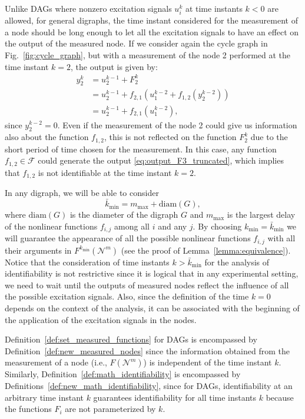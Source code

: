 \documentclass[letterpaper,10pt,journal]{IEEEtran}
\newcommand{\F}{\mathcal{F}}
\newcommand{\NN}{\mathcal{N}}
\begin{document}
Unlike DAGs where nonzero excitation signals $u_i^k$ at time instants $k<0$ are allowed, for general digraphs, the time instant considered for the measurement of a node should be long enough to let all the excitation signals to have an effect on the output of the measured node. If we consider again the cycle graph in Fig.~\ref{fig:cycle_graph}, but with a measurement of the node 2 performed at the time instant $k=2$, the output is given by:
\begin{align}
    y_2^k&=u_2^{k-1}+F_2^k\nonumber\\
    &=u_2^{k-1}+f_{2,1}(u_1^{k-2}+f_{1,2}(y_2^{k-2}))\nonumber\\
    &=u_2^{k-1}+f_{2,1}(u_1^{k-2}),\label{eq:output_F3_truncated}
\end{align}
since $y_2^{k-2}=0$. Even if the measurement of the node 2 could give us information also about the function $f_{1,2}$, this is not reflected on the function $F_2^k$ due to the short period of time chosen for the measurement. In this case, any function $f_{1,2}\in \F$ could generate the output \eqref{eq:output_F3_truncated}, which implies that $f_{1,2}$ is not identifiable at the time instant $k=2$. 


In any digraph, we will be able to consider
\begin{equation}\label{eq:k_min}
\bar k_{\min}=m_{\max}+\text{diam}(G),    
\end{equation}
where $\text{diam}(G)$ is the diameter of the digraph $G$ and $m_{\max}$ is the largest delay of the nonlinear functions $f_{i,j}$ among all $i$ and any $j$. By choosing $k_{\min}=\bar k_{\min}$ we will guarantee the appearance of all the possible nonlinear functions $f_{i,j}$ with all their arguments in $F^{k_{\min}}(\NN^m)$ (see the proof of Lemma~\ref{lemma:equivalence}). 
Notice that the consideration of time instants $k> \bar k_{\min}$ for the analysis of identifiability is not restrictive since it is logical that in any experimental setting, we need to wait until the outputs of measured nodes reflect the influence of all the possible excitation signals. Also, since the definition of the time $k=0$ depends on the context of the analysis, it can be associated with the beginning of the application of the excitation signals in the nodes.

 Definition~\ref{def:set_measured_functions} for DAGs is encompassed by Definition~\ref{def:new_measured_nodes} since the information obtained from the measurement of a node (i.e., $F(\NN^m)$) is independent of the time instant $k$. Similarly, Definition~\ref{def:math_identifiability} is encompassed by Definitions~\ref{def:new_math_identifiability}, since for DAGs, identifiability at an arbitrary time instant $k$ guarantees identifiability for all time instants $k$ because the functions $F_i$ are not parameterized \linebreak by $k$.
\end{document}
